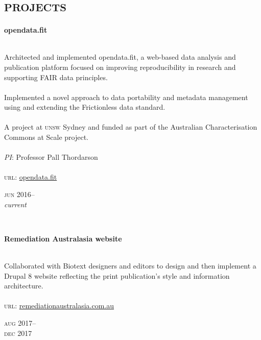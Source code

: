 
\vspace{-0.6cm}
\section*{\textsc{projects}}
\vspace{-0.2cm}

\begin{minipage}[t]{\mainboxwidth\textwidth}
\textbf{opendata.fit}\\
{\small
\\
Architected and implemented opendata.fit, a web-based data analysis and publication platform focused on improving reproducibility in research and supporting FAIR data principles.\\
\\
Implemented a novel approach to data portability and metadata management using and extending the Frictionless data standard.\\
\\
A project at \textsc{unsw} Sydney and funded as part of the Australian Characterisation Commons at Scale project.\\
\\
\textit{PI}: Professor Pall Thordarson\\
\\
\textsc{url}: \href{https://opendata.fit/}{opendata.fit} 
\par}
\end{minipage}
\begin{minipage}[t]{\detailboxwidth\textwidth}
{
\hfill \textsc{jun} 2016--\\ 
\hspace*{0pt} \hfill \textit{\small current}
\par
}
\end{minipage}
\\


\begin{minipage}[t]{\mainboxwidth\textwidth}
\textbf{Remediation Australasia website}\\
{\small
\\
Collaborated with Biotext designers and editors to design and then implement a Drupal 8 website reflecting
the print publication's style and information architecture. \\
\\
\textsc{url}: \href{https://www.remediationaustralasia.com.au/}{remediationaustralasia.com.au} 
\par
}
\end{minipage}
\begin{minipage}[t]{\detailboxwidth\textwidth}
{
\hfill \textsc{aug} 2017--\\ 
\hspace*{0pt} \hfill \textsc{dec} 2017
\par
}
\end{minipage}
\\

